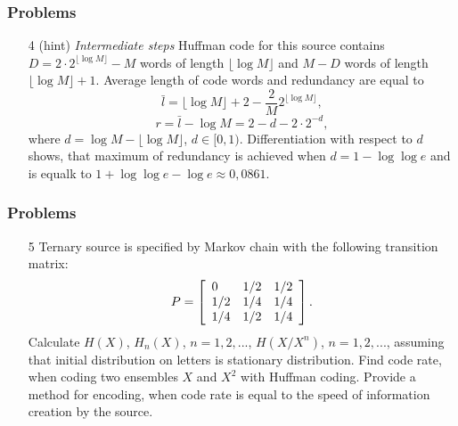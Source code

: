 \documentclass[14pt]{beamer}
\begin{document}
\begin{frame}
\frametitle{Problems}
\begin{enumerate}
   
  \item[4 (hint)] 
  \small{ \emph{Intermediate steps} Huffman code for this source contains $D=2\cdot 2^{\lfloor \log M \rfloor} - M$ words of length 
$\lfloor \log M \rfloor$ and  $M-D$ words of length $\lfloor \log M
\rfloor+1$. Average length of code words and redundancy are equal to 
\[
\bar l =\lfloor \log M \rfloor+2-\frac{2}{M}%
2^{\lfloor \log M \rfloor},
\]
\[
r=\bar l - \log M= 2-d-2\cdot 2^{-d},
\]
where $d=\log M - \lfloor \log M \rfloor$, $d\in[0,1)$.
Differentiation with respect to $d$ shows, that maximum of redundancy is achieved when $d=1-\log\log e$ and is equalk to $1+\log\log e - \log e
\approx 0,0861$.
  }
\end{enumerate}
\end{frame}


\begin{frame}
\frametitle{Problems}
\begin{enumerate}
  
  \item[5] 
  \small{ Ternary source is specified by Markov chain with the following transition matrix:
\[
P = \left[ {{\begin{array}{*{20}c}
 0 \hfill & {1 / 2} \hfill & {1 / 2} \hfill \\
 {1 / 2} \hfill & {1 / 4} \hfill & {1 / 4} \hfill \\
 {1 / 4} \hfill & {1 / 2} \hfill & {1 / 4} \hfill \\
\end{array} }} \right].
\]
Calculate $H\left( X \right)$, $H_n \left( X \right)$,  $n =
1,2,...$, $H\left( {X / X^n} \right)$, $n = 1,2,...$, assuming that initial distribution on letters is stationary distribution.
Find code rate, when coding two ensembles $X$ and $X^2$ with Huffman coding. Provide a method for encoding, when code rate is equal to the speed of information creation by the source. 
  }
\end{enumerate}
\end{frame}
\end{document}
